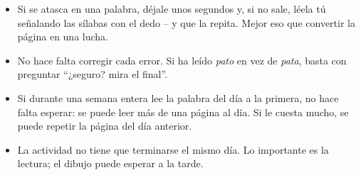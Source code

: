 {\small
\begin{itemize}[leftmargin=6mm, itemsep=1pt, topsep=2pt]
\item Si se atasca en una palabra, déjale unos segundos y, si no sale,
  léela tú señalando las sílabas con el dedo -- y que la repita. Mejor
  eso que convertir la página en una lucha.
\item No hace falta corregir cada error. Si ha leído \emph{pato} en vez
  de \emph{pata}, basta con preguntar ``¿seguro? mira el final''.
\item Si durante una semana entera lee la palabra del día a la primera,
  no hace falta esperar: se puede leer más de una página al día. Si le
  cuesta mucho, se puede repetir la página del día anterior.
\item La actividad no tiene que terminarse el mismo día. Lo importante
  es la lectura; el dibujo puede esperar a la tarde.
\end{itemize}}
\newpage
